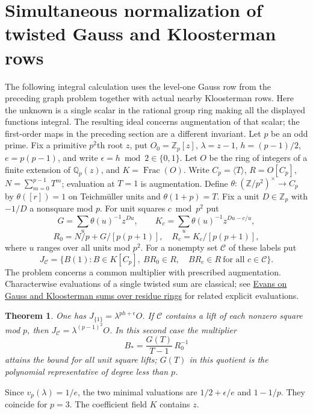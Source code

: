 \documentclass[11pt]{article}
\newtheorem{theorem}{Theorem}
\begin{document}
\section{Simultaneous normalization of twisted Gauss and Kloosterman rows}
The following integral calculation uses the level-one Gauss row from the preceding graph problem together with actual nearby Kloosterman rows. Here the unknown is a single scalar in the rational group ring making all the displayed functions integral. The resulting ideal concerns augmentation of that scalar; the first-order maps in the preceding section are a different invariant.
Let $p$ be an odd prime. Fix a primitive $p^2$th root $z$, put
$O_0=\mathbb Z_p[z]$, $\lambda=z-1$, $h=(p-1)/2$, $e=p(p-1)$, and write
$\epsilon=h\bmod2\in\{0,1\}$. Let $O$ be the ring of integers of a
finite extension of $\mathbb Q_p(z)$, and $K=\operatorname{Frac}(O)$.
Write $C_p=\langle T\rangle$, $R=O[C_p]$, $N=\sum_{m=0}^{p-1}T^m$;
evaluation at $T=1$ is augmentation. Define
$\theta:(\mathbb Z/p^2)^\times\to C_p$ by $\theta([r])=1$ on
Teichm\"uller units and $\theta(1+p)=T$. Fix a unit $D\in\mathbb Z_p$ with
$-1/D$ a nonsquare mod $p$. For unit squares $c\bmod p^2$ put
\[
 G=\sum_u\theta(u)^{-1}z^{Du},\qquad
 K_c=\sum_u\theta(u)^{-1}z^{Du-c/u},
\]
\[
 R_0=N/p+G/[p(p+1)],\quad R_c=K_c/[p(p+1)],
\]
where $u$ ranges over all units mod $p^2$. For a nonempty set
$\mathcal C$ of these labels put
\[
 J_{\mathcal C}=\{B(1):B\in K[C_p],\ B R_0\in R,\quad
                       B R_c\in R\ \text{for all }c\in\mathcal C\}.
\]
The problem concerns a common multiplier with prescribed augmentation.
Characterwise evaluations of a single twisted sum are classical; see
\href{https://mathweb.ucsd.edu/~revans/GaussKloosRingsAlgInt.pdf}{Evans on Gauss and Kloosterman sums over residue rings} for related explicit evaluations.

\begin{theorem}
One has $J_{\{1\}}=\lambda^{ph+\epsilon}O$.
If $\mathcal C$ contains a lift of each nonzero square mod $p$, then
$J_{\mathcal C}=\lambda^{(p-1)^2}O$. In this second case the multiplier
\[
 B_*=\frac{G(T)}{T-1}\,R_0^{-1}
\]
attains the bound for \emph{all} unit square lifts; $G(T)$ in this
quotient is the polynomial representative of degree less than $p$.
\end{theorem}
Since $v_p(\lambda)=1/e$, the two minimal valuations are
$1/2+\epsilon/e$ and $1-1/p$. They coincide for $p=3$.
The coefficient field $K$ contains $z$.
\end{document}
